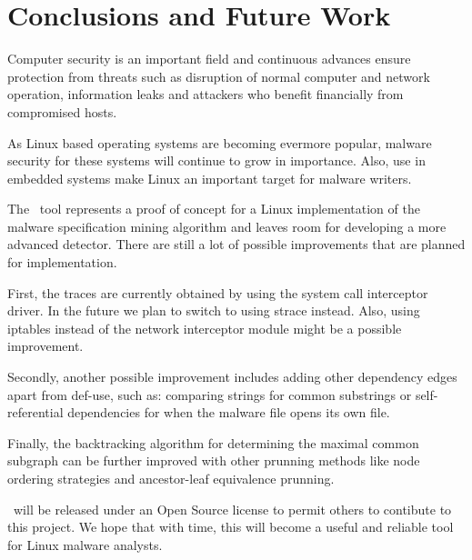 \chapter{Conclusions and Future Work}
\label{chapter:sixth-chapter}

Computer security is an important field and continuous advances ensure protection from threats such as disruption of normal computer and network operation, information leaks and attackers who benefit financially from compromised hosts.

As Linux based operating systems are becoming evermore popular, malware security for these systems will continue to grow in importance. Also, use in embedded systems make Linux an important target for malware writers.

The \textbf{\project}\ tool represents a proof of concept for a Linux implementation of the malware specification mining algorithm and leaves room for developing a more advanced detector. There are still a lot of possible improvements that are planned for implementation.

First, the traces are currently obtained by using the system call interceptor driver. In the future we plan to switch to using strace instead. Also, using iptables instead of the network interceptor module might be a possible improvement.

Secondly, another possible improvement includes adding other dependency edges apart from def-use, such as: comparing strings for common substrings or self-referential dependencies for when the malware file opens its own file.

Finally, the backtracking algorithm for determining the maximal common subgraph can be further improved with other prunning methods like node ordering strategies and ancestor-leaf equivalence prunning.

\textbf{\project}\ will be released under an Open Source license to permit others to contibute to this project. We hope that with time, this will become a useful and reliable tool for Linux malware analysts.